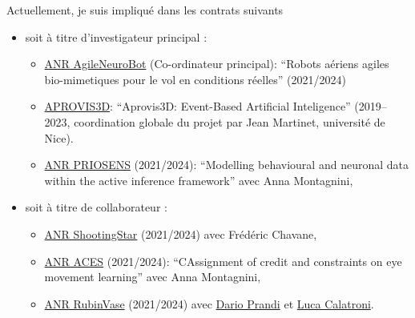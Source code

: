 \documentclass[10pt,french,a4paper,oneside]{article}%
\begin{document}
Actuellement, je suis impliqué dans les contrats suivants
\begin{itemize}
\item soit à titre d'investigateur principal :
\begin{itemize}
	\item  \href{https://laurentperrinet.github.io/grant/anr-anb/}{ANR AgileNeuroBot} (Co-ordinateur principal): ``Robots aériens agiles bio-mimetiques pour le vol en conditions réelles'' (2021/2024)
	\item  \href{https://laurentperrinet.github.io/grant/aprovis-3-d/}{APROVIS3D}: ``Aprovis3D: Event-Based Artificial Inteligence'' (2019--2023, coordination globale du projet par Jean Martinet, université de Nice).
 	\item \href{https://laurentperrinet.github.io/grant/anr-priosens/}{ANR PRIOSENS} (2021/2024): ``Modelling behavioural and neuronal data within the active inference framework'' avec Anna Montagnini,
\end{itemize}
\item soit à titre de collaborateur :

\begin{itemize}
 \item \href{https://laurentperrinet.github.io/grant/anr-shootingstar/}{ANR ShootingStar} (2021/2024) avec Frédéric Chavane,
 \item \href{https://laurentperrinet.github.io/grant/anr-aces/}{ANR ACES} (2021/2024): ``CAssignment of credit and constraints on eye movement learning'' avec Anna Montagnini,
 \item \href{https://laurentperrinet.github.io/grant/anr-predicteye/}{ANR RubinVase} (2021/2024) avec \href{https://scholar.google.com/citations?user=22p8Wc4AAAAJ}{Dario Prandi} et \href{https://scholar.google.com/citations?user=dRVPKmkAAAAJ}{Luca Calatroni}.
\end{itemize}


\end{itemize}
\end{document}
